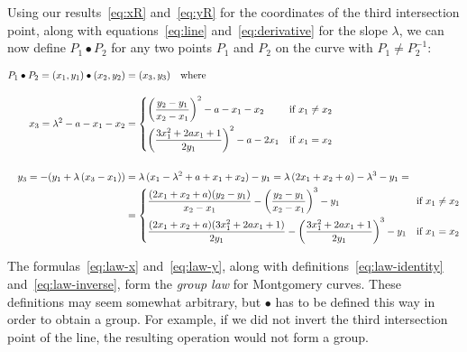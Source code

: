 \documentclass{article}
\begin{document}
Using our results~\eqref{eq:xR} and~\eqref{eq:yR} for the coordinates of the third intersection point, along with equations~\eqref{eq:line} and~\eqref{eq:derivative} for the slope $\lambda$, we can now define $P_1 \bullet P_2$ for any two points $P_1$ and $P_2$ on the curve with $P_1 \neq P_2^{-1}$:

\begin{align}
P_1 \bullet P_2 = (x_1, y_1) \bullet (x_2, y_2) &= (x_3, y_3) \quad\text{where}\nonumber\\[10pt]
x_3 = \lambda^2 - a - x_1 - x_2 &= \begin{dcases}
\left(\frac{y_2 - y_1}{x_2 - x_1}\right)^2 - a - x_1 - x_2 & \text{if } x_1 \neq x_2 \\
\left(\frac{3x_1^2 + 2ax_1 + 1}{2y_1}\right)^2 - a - 2x_1 & \text{if } x_1 = x_2
\end{dcases}\label{eq:law-x}\\[15pt]
y_3 = -(y_1 + \lambda\,(x_3 - x_1)) &= \lambda\,(x_1 - \lambda^2 + a + x_1 + x_2) - y_1 =
\lambda\,(2x_1 + x_2 + a) - \lambda^3 - y_1 =\label{eq:law-y}\\
&= \begin{dcases}
\frac{(2x_1 + x_2 + a) (y_2 - y_1)}{x_2 - x_1} - \left(\frac{y_2 - y_1}{x_2 - x_1}\right)^3 - y_1 & \text{if } x_1 \neq x_2 \\
\frac{(2x_1 + x_2 + a) (3x_1^2 + 2ax_1 + 1)}{2y_1} - \left(\frac{3x_1^2 + 2ax_1 + 1}{2y_1}\right)^3 - y_1 & \text{if } x_1 = x_2
\end{dcases}\nonumber
\end{align}

The formulas~\eqref{eq:law-x} and~\eqref{eq:law-y}, along with definitions~\eqref{eq:law-identity} and~\eqref{eq:law-inverse}, form the \emph{group law} for Montgomery curves.
These definitions may seem somewhat arbitrary, but $\bullet$ has to be defined this way in order to obtain a group.
For example, if we did not invert the third intersection point of the line, the resulting operation would not form a group.
\end{document}
